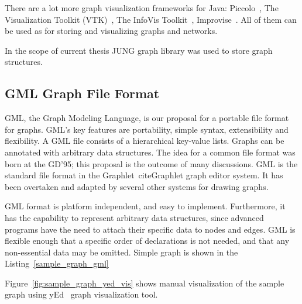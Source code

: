There are a lot more graph visualization frameworks for Java: Piccolo~\cite{Piccolo}, The Visualization Toolkit (VTK)~\cite{VTK}, The InfoVis Toolkit~\cite{InfoVis_Toolkit}, Improvise~\cite{Improvise}. All of them can be used as for storing and visualizing graphs and networks.


In the scope of current thesis JUNG graph library was used to store graph structures.

\subsection{GML Graph File Format}
 GML, the Graph Modeling Language, is our proposal for a portable file format for graphs. GML's key features are portability, simple syntax, extensibility and flexibility. A GML file consists of a hierarchical key-value lists. Graphs can be annotated with arbitrary data structures. The idea for a common file format was born at the GD'95; this proposal is the outcome of many discussions. GML is the standard file format in the Graphlet~cite{Graphlet} graph editor system. It has been overtaken and adapted by several other systems for drawing graphs.~\cite{GML}


GML format is platform independent, and easy to implement. Furthermore, it has the capability to represent arbitrary data structures, since advanced programs have the need to attach their specific data to nodes and edges. GML is flexible enough that a specific order of declarations is not needed, and that any non-essential data may be omitted. Simple graph is shown in the Listing~\ref{sample_graph_gml}

\begin{center}
    \renewcommand{\thelstlisting}{\thesection.\arabic{lstlisting}}
	
\end{center}

Figure~\ref{fig:sample_graph_yed_vis} shows manual visualization of the sample graph using yEd~\cite{yed} graph visualization tool.

